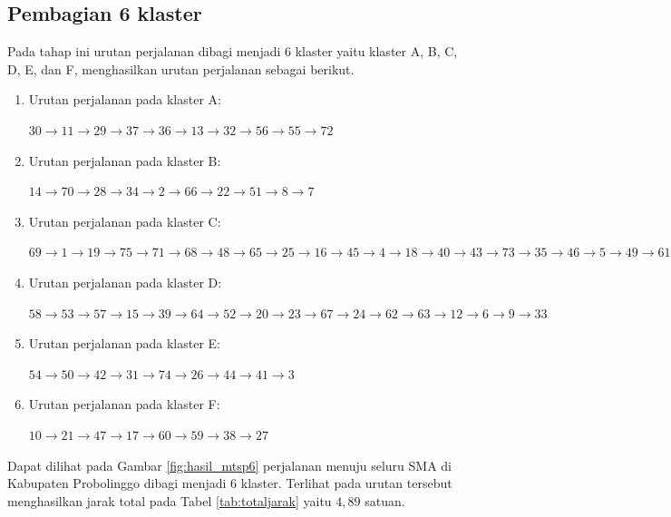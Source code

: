 \subsection{Pembagian 6 klaster}

Pada tahap ini urutan perjalanan dibagi menjadi 6 klaster yaitu klaster A, B, C, D, E, dan F, menghasilkan urutan perjalanan sebagai berikut.

\begin{enumerate}

\item Urutan perjalanan pada klaster A:

$30\rightarrow11\rightarrow29\rightarrow37\rightarrow36\rightarrow13\rightarrow32\rightarrow56\rightarrow55\rightarrow72$

\item Urutan perjalanan pada klaster B:

$14\rightarrow70\rightarrow28\rightarrow34\rightarrow2\rightarrow66\rightarrow22\rightarrow51\rightarrow8\rightarrow7$

\item Urutan perjalanan pada klaster C:

$69\rightarrow1\rightarrow19\rightarrow75\rightarrow71\rightarrow68\rightarrow48\rightarrow65\rightarrow25\rightarrow16\rightarrow45\rightarrow4\rightarrow18\rightarrow40\rightarrow43\rightarrow73\rightarrow35\rightarrow46\rightarrow5\rightarrow49\rightarrow61$

\item Urutan perjalanan pada klaster D:

$58\rightarrow53\rightarrow57\rightarrow15\rightarrow39\rightarrow64\rightarrow52\rightarrow20\rightarrow23\rightarrow67\rightarrow24\rightarrow62\rightarrow63\rightarrow12\rightarrow6\rightarrow9\rightarrow33$

\item Urutan perjalanan pada klaster E:

$54\rightarrow50\rightarrow42\rightarrow31\rightarrow74\rightarrow26\rightarrow44\rightarrow41\rightarrow3$

\item Urutan perjalanan pada klaster F:

$10\rightarrow21\rightarrow47\rightarrow17\rightarrow60\rightarrow59\rightarrow38\rightarrow27$

\end{enumerate}

Dapat dilihat pada Gambar \ref{fig:hasil_mtsp6} perjalanan menuju seluru SMA di Kabupaten Probolinggo dibagi menjadi 6 klaster. Terlihat pada urutan tersebut menghasilkan jarak total pada Tabel \ref{tab:totaljarak} yaitu $4,89$ satuan.

